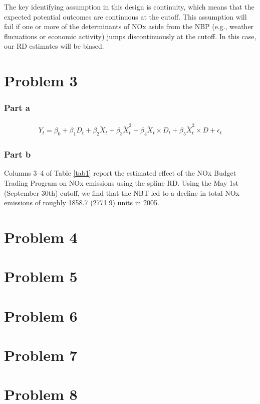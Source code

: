 \documentclass[12pt]{article}
\begin{document}
The key identifying assumption in this design is continuity, which means that the expected potential outcomes are continuous at the cutoff. This assumption will fail if one or more of the determinants of NOx aside from the NBP (e.g., weather flucuations or economic activity) jumps discontinuously at the cutoff. In this case, our RD estimates will be biased.

\section*{Problem 3}

\subsubsection*{Part a}

\begin{align}
	Y_t = \beta_0 + \beta_1 D_t + \beta_2 \tilde{X}_t + \beta_3 \tilde{X}_t^2 + \beta_4 \tilde{X}_t \times 
		D_t + \beta_5 \tilde{X}_t^2 \times D + \epsilon_t
\end{align}

\subsubsection*{Part b}
Columns 3--4 of Table \ref{tab1} report the estimated effect of the NOx Budget Trading Program on NOx emissions using the spline RD. Using the May 1st (September 30th) cutoff, we find that the NBT led to a decline in total NOx emissions of roughly 1858.7 (2771.9) units in 2005.

\section*{Problem 4}

\section*{Problem 5}

\section*{Problem 6}

\section*{Problem 7}

\section*{Problem 8}
\end{document}
